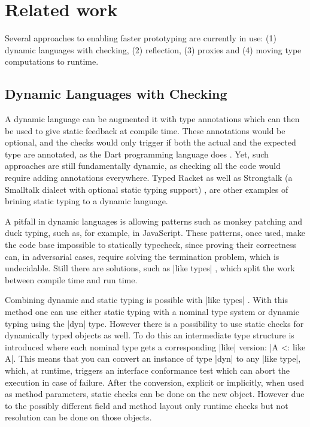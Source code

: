 \section{Related work}

Several approaches to enabling faster prototyping are currently in use: (1) dynamic languages with checking, (2) reflection, (3) proxies and (4) moving type computations to runtime.

\subsection{Dynamic Languages with Checking}

A dynamic language can be augmented it with type annotations which can then be used to give static feedback at compile time. These annotations would be optional, and the checks would only trigger if both the actual and the expected type are annotated, as the Dart programming language does \cite{dart}. Yet, such approaches are still fundamentally dynamic, as checking all the code would require adding annotations everywhere. Typed Racket \cite{racket} as well as Strongtalk (a Smalltalk dialect with optional static typing support) \cite{strongtalk}, are other examples of brining static typing to a dynamic language.

A pitfall in dynamic languages is allowing patterns such as monkey patching and duck typing, such as, for example, in JavaScript. These patterns, once used, make the code base impossible to statically typecheck, since proving their correctness can, in adversarial cases, require solving the termination problem, which is undecidable. Still there are solutions, such as |like types| \cite{liketypes}, which split the work between compile time and run time.

Combining dynamic and static typing is possible with |like types| \cite{liketypes}. With this method one can use either static typing with a nominal type system or dynamic typing using the |dyn| type. However there is a possibility to use static checks for dynamically typed objects as well. To do this an intermediate type structure is introduced where each nominal type gets a corresponding |like| version: |A <: like A|. This means that you can convert an instance of type |dyn| to any |like type|, which, at runtime, triggers an interface conformance test which can abort the execution in case of failure. After the conversion, explicit or implicitly, when used as method parameters, static checks can be done on the new object. However due to the possibly different field and method layout only runtime checks but not resolution can be done on those objects.

